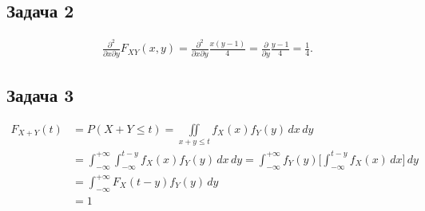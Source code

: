 \documentclass[a4paper,11pt]{article}
\begin{document}
\subsection{Задача 2}

\begin{align*}
\frac{\partial^2}{\partial x \partial y}F_{XY}(x,y) 
= \frac{\partial^2}{\partial x \partial y}\frac{x(y-1)}{4}
= \frac{\partial}{\partial y}\frac{y-1}{4} = \frac{1}{4}.
\end{align*}

\subsection{Задача 3}

\begin{align*}
F_{X+Y}(t) & = P(X+Y \leq t) = \iint\limits_{x+y \leq t} f_X(x)f_Y(y)\,dx\,dy \\
& = \int_{-\infty}^{+\infty} \int_{-\infty}^{t-y} f_X(x)f_Y(y)\,dx\,dy
  = \int_{-\infty}^{+\infty} f_Y(y) \bigg[\int_{-\infty}^{t-y} f_X(x)\,dx \bigg]\,dy \\
& = \int_{-\infty}^{+\infty} F_X(t-y) f_Y(y)\,dy \\
& = 1
\end{align*}
\end{document}
